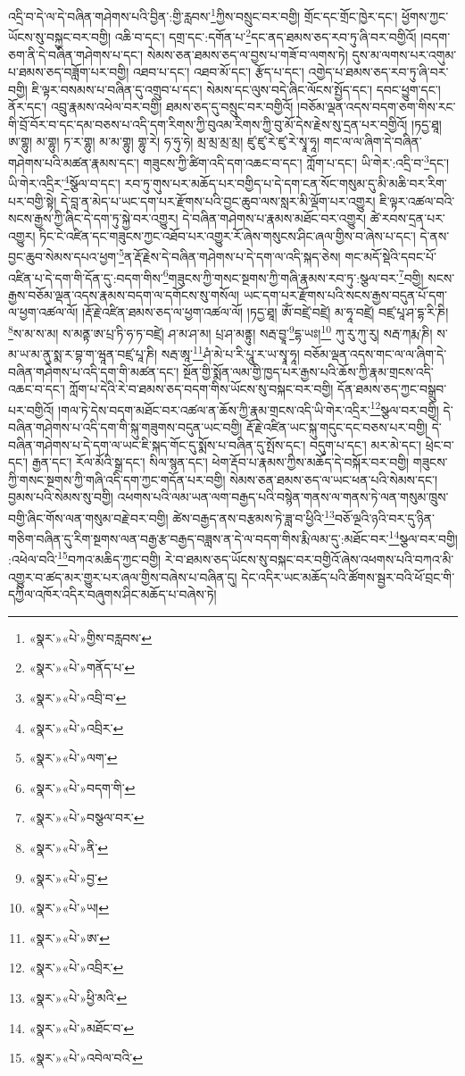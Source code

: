 འདྲི་བ་དེ་ལ་དེ་བཞིན་གཤེགས་པའི་བྱིན་:གྱི་རླབས་\footnote{«སྣར་»«པེ་»གྱིས་བརླབས་}ཀྱིས་བསྲུང་བར་བགྱི། གྲོང་དང་གྲོང་ཁྱེར་དང་། ཕྱོགས་ཀྱང་ཡོངས་སུ་བསྐྱང་བར་བགྱི། འཆི་བ་དང་། དགྲ་དང་:དགོན་པ་\footnote{«སྣར་»«པེ་»གནོད་པ་}དང་ནད་ཐམས་ཅད་རབ་ཏུ་ཞི་བར་བགྱིའོ། །བདག་ཅག་ནི་དེ་བཞིན་གཤེགས་པ་དང་། སེམས་ཅན་ཐམས་ཅད་ལ་བྱས་པ་གཟོ་བ་ལགས་ཏེ། དུས་མ་ལགས་པར་འགུམ་པ་ཐམས་ཅད་བཟློག་པར་བགྱི། འཐབ་པ་དང་། འཐབ་མོ་དང་། རྩོད་པ་དང་། འགྱེད་པ་ཐམས་ཅད་རབ་ཏུ་ཞི་བར་བགྱི། ཇི་ལྟར་བསམས་པ་བཞིན་དུ་འགྲུབ་པ་དང་། སེམས་དང་ལུས་བདེ་ཞིང་ལོངས་སྤྱོད་དང་། དབང་ཕྱུག་དང་། ནོར་དང་། འབྲུ་རྣམས་འཕེལ་བར་བགྱི། ཐམས་ཅད་དུ་བསྲུང་བར་བགྱིའོ། །བཅོམ་ལྡན་འདས་བདག་ཅག་གིས་རང་གི་བྲོ་བོར་བ་དང་དམ་བཅས་པ་འདི་དག་རིགས་ཀྱི་བུའམ་རིགས་ཀྱི་བུ་མོ་དེས་རྗེས་སུ་དྲན་པར་བགྱིའོ། །ཏདྱ་ཐཱ། ཨ་གྷུ། མ་གྷུ། ཏ་ར་གྷུ། མ་མ་གྷུ། གྷུ་རེ། ཧ་ཧུ་ཧེ། མྲ་མྲ་མྲ་མྲ། ཛུ་ཛུ་རེ་ཛུ་རེ་སྭཱ་ཧཱ། གང་ལ་ལ་ཞིག་དེ་བཞིན་གཤེགས་པའི་མཚན་རྣམས་དང་། གཟུངས་ཀྱི་ཚིག་འདི་དག་འཆང་བ་དང་། ཀློག་པ་དང་། ཡི་གེར་:འདྲི་བ་\footnote{«སྣར་»«པེ་»འབྲི་བ་}དང་། ཡི་གེར་འདྲིར་\footnote{«སྣར་»«པེ་»འབྲིར་}སྩོལ་བ་དང་། རབ་ཏུ་གུས་པར་མཆོད་པར་བགྱིད་པ་དེ་དག་ངན་སོང་གསུམ་དུ་མི་མཆི་བར་རིག་པར་བགྱི་སྟེ། དེ་བླ་ན་མེད་པ་ཡང་དག་པར་རྫོགས་པའི་བྱང་ཆུབ་ལས་སླར་མི་ལྡོག་པར་འགྱུར། ཇི་ལྟར་འཚལ་བའི་སངས་རྒྱས་ཀྱི་ཞིང་དེ་དག་ཏུ་སྐྱེ་བར་འགྱུར། དེ་བཞིན་གཤེགས་པ་རྣམས་མཐོང་བར་འགྱུར། ཚེ་རབས་དྲན་པར་འགྱུར། ཏིང་ངེ་འཛིན་དང་གཟུངས་ཀྱང་འཐོབ་པར་འགྱུར་རོ་ཞེས་གསུངས་ཤིང་ཞལ་གྱིས་བ་ཞེས་པ་དང་། དེ་ནས་བྱང་ཆུབ་སེམས་དཔའ་ཕྱག་\footnote{«སྣར་»«པེ་»ལག་}ན་རྡོ་རྗེས་དེ་བཞིན་གཤེགས་པ་དེ་དག་ལ་འདི་སྐད་ཅེས། གང་མདོ་སྡེའི་དབང་པོ་འཛིན་པ་དེ་དག་གི་དོན་དུ་:བདག་གིས་\footnote{«སྣར་»«པེ་»བདག་གི་}གཟུངས་ཀྱི་གསང་སྔགས་ཀྱི་གཞི་རྣམས་རབ་ཏུ་:སྩལ་བར་\footnote{«སྣར་»«པེ་»བསྩལ་བར་}བགྱི། སངས་རྒྱས་བཅོམ་ལྡན་འདས་རྣམས་བདག་ལ་དགོངས་སུ་གསོལ། ཡང་དག་པར་རྫོགས་པའི་སངས་རྒྱས་བདུན་པོ་དག་ལ་ཕྱག་འཚལ་ལོ། །རྡོ་རྗེ་འཛིན་ཐམས་ཅད་ལ་ཕྱག་འཚལ་ལོ། །ཏདྱ་ཐཱ། ཨོཾ་བཛྲེ་བཛྲེ། མ་ཧཱ་བཛྲེ། བཛྲ་པཱ་ཤ་དྷ་རི་ཎི། \footnote{«སྣར་»«པེ་»ནི་}ས་མ་ས་མ། ས་མནྟ་ཨ་པྲ་ཏི་ཧ་ཏ་བཛྲེ། ཤ་མ་ཤ་མ། པྲ་ཤ་མནྟུ། སརྦ་བྱཱ་\footnote{«སྣར་»«པེ་»བྱ་}དྷ་ཡཿ།\footnote{«སྣར་»«པེ་»ཡ།} ཀུ་རུ་ཀུ་རུ། སརྦ་ཀརྨ་ཎི། ས་མ་ཡ་མ་ནུ་སྨ་ར་བྷ་ག་ཝཱན་བཛྲ་པཱ་ཎི། སརྦ་ཨཱ་\footnote{«སྣར་»«པེ་»ཨ་}ཤཾ་མེ་པ་རི་པཱུ་ར་ཡ་སྭཱ་ཧཱ། བཅོམ་ལྡན་འདས་གང་ལ་ལ་ཞིག་དེ་བཞིན་གཤེགས་པ་འདི་དག་གི་མཚན་དང་། སྔོན་གྱི་སྨོན་ལམ་གྱི་ཁྱད་པར་རྒྱས་པའི་ཆོས་ཀྱི་རྣམ་གྲངས་འདི་འཆང་བ་དང་། ཀློག་པ་དེའི་རེ་བ་ཐམས་ཅད་བདག་གིས་ཡོངས་སུ་བསྐང་བར་བགྱི། དོན་ཐམས་ཅད་ཀྱང་བསྒྲུབ་པར་བགྱིའོ། །གལ་ཏེ་དེས་བདག་མཐོང་བར་འཚལ་ན་ཆོས་ཀྱི་རྣམ་གྲངས་འདི་ཡི་གེར་འདྲིར་\footnote{«སྣར་»«པེ་»འབྲིར་}སྩལ་བར་བགྱི། དེ་བཞིན་གཤེགས་པ་འདི་དག་གི་སྐུ་གཟུགས་བདུན་ཡང་བགྱི། རྡོ་རྗེ་འཛིན་ཡང་སྐུ་གདུང་དང་བཅས་པར་བགྱི། དེ་བཞིན་གཤེགས་པ་དེ་དག་ལ་ཡང་ཇི་སྐད་གོང་དུ་སྨོས་པ་བཞིན་དུ་སྤོས་དང་། བདུག་པ་དང་། མར་མེ་དང་། ཕྲེང་བ་དང་། རྒྱན་དང་། རོལ་མོའི་སྒྲ་དང་། སིལ་སྙན་དང་། ཕེག་རྡོབ་པ་རྣམས་ཀྱིས་མཆོད་དེ་བསྐོར་བར་བགྱི། གཟུངས་ཀྱི་གསང་སྔགས་ཀྱི་གཞི་འདི་དག་ཀྱང་གདོན་པར་བགྱི། སེམས་ཅན་ཐམས་ཅད་ལ་ཡང་ཕན་པའི་སེམས་དང་། བྱམས་པའི་སེམས་སུ་བགྱི། འཕགས་པའི་ལམ་ཡན་ལག་བརྒྱད་པའི་བསྙེན་གནས་ལ་གནས་ཏེ་ལན་གསུམ་ཁྲུས་བགྱི་ཞིང་གོས་ལན་གསུམ་བརྗེ་བར་བགྱི། ཚེས་བརྒྱད་ནས་བརྩམས་ཏེ་ཟླ་བ་ཕྱིའི་\footnote{«སྣར་»«པེ་»ཕྱི་མའི་}བཅོ་ལྔའི་ཉའི་བར་དུ་ཉིན་གཅིག་བཞིན་དུ་རིག་སྔགས་ལན་བརྒྱ་རྩ་བརྒྱད་བཟླས་ན་དེ་ལ་བདག་གིས་རྨི་ལམ་དུ་:མཐོང་བར་\footnote{«སྣར་»«པེ་»མཐོང་བ་}སྩལ་བར་བགྱི། :འཕེལ་བའི་\footnote{«སྣར་»«པེ་»འབེལ་བའི་}བཀའ་མཆིད་ཀྱང་བགྱི། རེ་བ་ཐམས་ཅད་ཡོངས་སུ་བསྐང་བར་བགྱིའོ་ཞེས་འཕགས་པའི་བཀའ་མི་འགྱུར་བ་ཚད་མར་གྱུར་པར་ཞལ་གྱིས་བཞེས་པ་བཞིན་དུ། དེང་འདིར་ཡང་མཆོད་པའི་ཚོགས་སྦྱར་བའི་ཕོ་བྲང་གི་དཀྱིལ་འཁོར་འདིར་བཞུགས་ཤིང་མཆོད་པ་བཞེས་ཏེ། 
